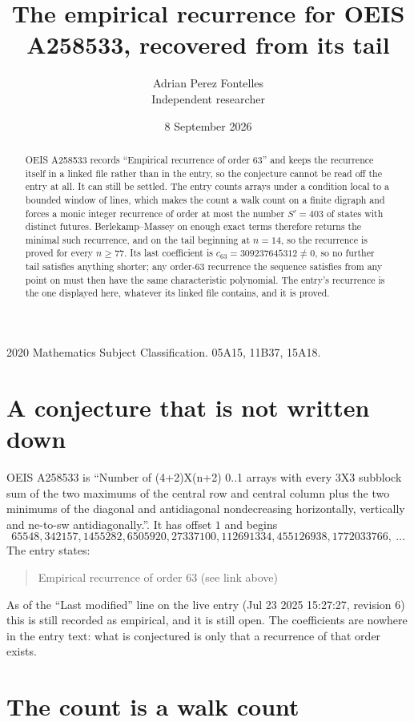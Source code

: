 \documentclass[11pt,a4paper]{article}
\title{The empirical recurrence for OEIS A258533, recovered from its tail}
\author{Adrian Perez Fontelles\\ \small Independent researcher}
\date{8 September 2026}
\theoremstyle{plain}
\theoremstyle{definition}
\begin{document}
\maketitle

\begin{abstract}
OEIS A258533 records ``Empirical recurrence of order $63$'' and keeps the recurrence itself in
a linked file rather than in the entry, so the conjecture cannot be read off the entry at all.
It can still be settled. The entry counts arrays under a condition local to a bounded window of
lines, which makes the count a walk count on a finite digraph and forces a monic integer
recurrence of order at most the number $S'=403$ of states with distinct futures. Berlekamp--Massey on
enough exact terms therefore returns the minimal such recurrence, and on the tail beginning at $n=14$, so the recurrence is proved for every $n\ge77$.
Its last coefficient is $c_{63}=309237645312\neq0$, so no further tail satisfies anything
shorter; any order-$63$ recurrence the sequence satisfies from any point on must then have
the same characteristic polynomial. The entry's recurrence is the one displayed here, whatever
its linked file contains, and it is proved.
\end{abstract}

\noindent\small 2020 Mathematics Subject Classification. 05A15, 11B37, 15A18.\normalsize

\section{A conjecture that is not written down}

OEIS A258533 is ``Number of (4+2)X(n+2) 0..1 arrays with every 3X3 subblock sum of the two maximums of the central row and central column plus the two minimums of the diagonal and antidiagonal nondecreasing horizontally, vertically and ne-to-sw antidiagonally.''. It has offset $1$ and begins
\[
65548, 342157, 1455282, 6505920, 27337100, 112691334, 455126938, 1772033766,\ \dots
\]
The entry states:
\begin{quote}
Empirical recurrence of order 63 (see link above)
\end{quote}
As of the ``Last modified'' line on the live entry (Jul 23 2025 15:27:27, revision 6)
this is still recorded as empirical, and it is still open. The coefficients are nowhere in the
entry text: what is conjectured is only that a recurrence of that order exists.

\section{The count is a walk count}
\end{document}
